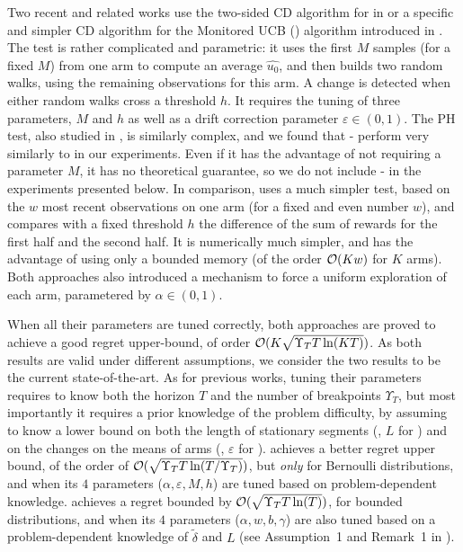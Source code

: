 Two recent and related works use
the two-sided \CUSUM{} CD algorithm for \CUSUMUCB{} in \cite{LiuLeeShroff17}
or a specific and simpler CD algorithm for the Monitored UCB (\MUCB) algorithm introduced in \cite{CaoZhenKvetonXie18}.
%
The \CUSUM{} test is rather complicated and parametric: it uses the first $M$ samples (for a fixed $M$) from one arm to compute an average $\hat{u_0}$, and then builds two random walks, using the remaining observations for this arm. A change is detected when either random walks cross a threshold $h$.
It requires the tuning of three parameters, $M$ and $h$ as well as a drift correction parameter $\varepsilon\in(0,1)$.
The PH test, also studied in \cite{LiuLeeShroff17}, is similarly complex,
and we found that \PHT-\UCB{} perform very similarly to \CUSUMUCB{} in our experiments.
Even if it has the advantage of not requiring a parameter $M$,
it has no theoretical guarantee, so we do not include \PHT-\UCB{} in the experiments presented below.
%
In comparison, \MUCB{} uses a much simpler test, based on the $w$ most recent observations on one arm (for a fixed and even number $w$), and compares with a fixed threshold $h$ the difference of the sum of rewards for the first half and the second half. It is numerically much simpler, and has the advantage of using only a bounded memory (of the order $\mathop{}\mathopen{}\mathcal{O}\mathopen{}\left(K w\right)$ for $K$ arms).
%
Both approaches also introduced a mechanism to force a uniform exploration of each arm, parametered by $\alpha\in(0,1)$.

When all their parameters are tuned correctly, both approaches are proved to achieve a good regret upper-bound, of order $\mathcal{O}(K \sqrt{\Upsilon_T T \ln(K T)})$.
As both results are valid under different assumptions, we consider the two results to be the current state-of-the-art.
As for previous works, tuning their parameters requires to know both the horizon $T$ and the number of breakpoints $\Upsilon_T$, but most importantly it requires a prior knowledge of the problem difficulty, by assuming to know a lower bound on both the length of stationary segments (\eg, $L$ for \MUCB) and on the changes on the means of arms (\eg, $\varepsilon$ for \CUSUM).
%
\CUSUMUCB{} achieves a better regret upper bound, of the order of $\mathcal{O}(\sqrt{\Upsilon_T T \ln(T / \Upsilon_T)})$, but \emph{only} for Bernoulli distributions,
and when its $4$ parameters ($\alpha,\varepsilon,M,h$) are tuned based on problem-dependent knowledge.
%
\MUCB{} achieves a regret bounded by $\mathcal{O}(\sqrt{\Upsilon_T T \ln(T)})$, for bounded distributions, and when its $4$ parameters ($\alpha,w,b,\gamma$) are also tuned based on a problem-dependent knowledge of $\tilde{\delta}$ and $L$ (see Assumption~1 and Remark~1 in \cite{CaoZhenKvetonXie18}).


